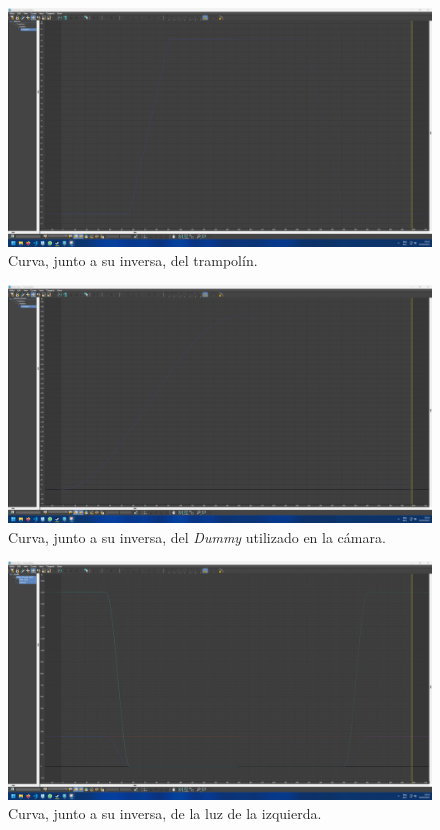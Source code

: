 \begin{figure}[H]
   \centering
   \includegraphics[width=\textwidth]{imagenes/curvas finales/trampolin.png}
   \caption{Curva, junto a su inversa, del trampolín.}
\end{figure}

\begin{figure}[H]
   \centering
   \includegraphics[width=\textwidth]{imagenes/curvas finales/DCamara.png}
   \caption{Curva, junto a su inversa, del \textit{Dummy} utilizado en la cámara.}
\end{figure}

\begin{figure}[H]
   \centering
   \includegraphics[width=\textwidth]{imagenes/curvas finales/LL.png}
   \caption{Curva, junto a su inversa, de la luz de la izquierda.}
\end{figure}

